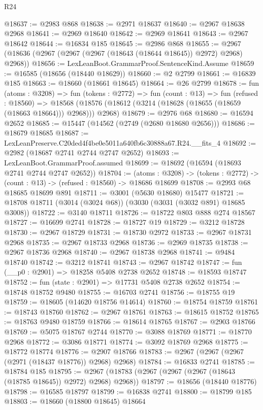 \begin{lexlean}{R24}
\begin{coremodule}
@18637 := @2983 @868
@18638 := @2971 @18637
@18640 := @2967 @18638 @2968
@18641 := @2969 @18640
@18642 := @2969 @18641
@18643 := @2967 @18642
@18644 := @16834 @185
@18645 := @2986 @868
@18655 := @2967 (@18636 (@2967 (@2967 (@2967 (@18643 (@18644 @18645)) @2972) @2968) @2968))
@18656 := LexLeanBoot.GrammarProof.SentenceKind.Assume
@18659 := @16585 (@18656 (@18440 @18629))
@18660 := @2 @2799
@18661 := @16839 @185
@18663 := @18660 (@18661 @18645)
@18664 := @26 @2799
@18678 := fun (atoms : @3208) =>
  fun (tokens : @2772) =>
  fun (count : @13) =>
  fun (refused : @18560) =>
  @18568 (@18576 (@18612 (@3214 (@18628 (@18655 (@18659 (@18663 @18664))) @2968))) @2968)
@18679 := @2976 @68
@18680 := @16594 @2652
@18685 := @15447 (@14562 (@2749 (@2680 @18680 @2656)))
@18686 := @18679 @18685
@18687 := LexLeanPreserve.C20ded4f4be0e5011a640fb6c30888a67.R24.__fits_4
@18692 := @2982 (@18687 @2741 @2744 @2747 @2652)
@18693 := LexLeanBoot.GrammarProof.assumed
@18699 := @18692 (@16594 (@18693 @2741 @2744 @2747 @2652))
@18704 := (atoms : @3208) ->
  (tokens : @2772) -> (count : @13) -> (refused : @18560) -> @18686 @18699
@18708 := @2993 @68 @18685 @18699 @891
@18711 := @3001 (@5630 @18680) @15477
@18721 := @18708 @18711 (@3014 (@3024 @68)) (@3030 (@3031 (@3032 @891) @18685 @3008))
@18722 := @3140 @18711
@18726 := @18722 @803 @888 @274 @18567
@18727 := @16699 @2741
@18728 := @18727 @19
@18729 := @3212 @18728
@18730 := @2967 @18729
@18731 := @18730 @2972
@18733 := @2967 @18731 @2968
@18735 := @2967 @18733 @2968
@18736 := @2969 @18735
@18738 := @2967 @18736 @2968
@18740 := @2967 @18738 @2968
@18741 := @9484 @18740
@18742 := @3212 @18741
@18743 := @2967 @18742
@18747 := fun (__p0 : @2901) => @18258 @5408 @2738 @2652
@18748 := @18593 @18747
@18752 := fun (state : @2901) => @17731 @5408 @2738 @2652
@18754 := @18748 @18752 @9480
@18755 := @16703 @2741
@18756 := @18755 @19
@18759 := @18605 (@14620 @18756 @14614)
@18760 := @18754 @18759
@18761 := @18743 @18760
@18762 := @2967 @18761
@18763 := @18615 @18752
@18765 := @18763 @9480 @18759
@18766 := @18614 @18765
@18767 := @2903 @18766
@18769 := @5075 @18767 @2744
@18770 := @3088 @18769
@18771 := @18770 @2968
@18772 := @3086 @18771
@18774 := @3092 @18769 @2968
@18775 := @18772 @18774
@18776 := @2907 @18766
@18783 := @2967 (@2967 (@2967 (@2971 (@18437 @18776)) @2968) @2968)
@18784 := @16833 @2741
@18785 := @18784 @185
@18795 := @2967 (@18783 (@2967 (@2967 (@2967 (@18643 (@18785 @18645)) @2972) @2968) @2968))
@18797 := @18656 (@18440 @18776)
@18798 := @16585 @18797
@18799 := @16838 @2741
@18800 := @18799 @185
@18803 := @18660 (@18800 @18645) @18664

\end{coremodule}
\end{lexlean}
